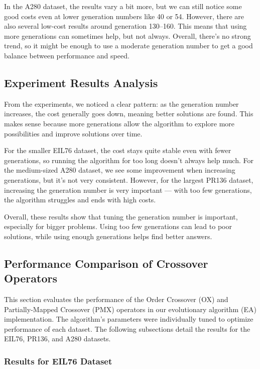 \documentclass{scrartcl}
\begin{document}
In the A280 dataset, the results vary a bit more, but we can still notice some good costs even at lower generation numbers like 40 or 54. However, there are also several low-cost results around generation 130–160. This means that using more generations can sometimes help, but not always. Overall, there's no strong trend, so it might be enough to use a moderate generation number to get a good balance between performance and speed.



\subsection{Experiment Results Analysis}

From the experiments, we noticed a clear pattern: as the generation number increases, the cost generally goes down, meaning better solutions are found. This makes sense because more generations allow the algorithm to explore more possibilities and improve solutions over time.

For the smaller EIL76 dataset, the cost stays quite stable even with fewer generations, so running the algorithm for too long doesn’t always help much. For the medium-sized A280 dataset, we see some improvement when increasing generations, but it’s not very consistent. However, for the largest PR136 dataset, increasing the generation number is very important — with too few generations, the algorithm struggles and ends with high costs.

Overall, these results show that tuning the generation number is important, especially for bigger problems. Using too few generations can lead to poor solutions, while using enough generations helps find better answers.


\subsection{Performance Comparison of Crossover Operators}

This section evaluates the performance of the Order Crossover (OX) and Partially-Mapped Crossover (PMX) operators in our evolutionary algorithm (EA) implementation. The algorithm's parameters were individually tuned to optimize performance of each dataset. The following subsections detail the results for the EIL76, PR136, and A280 datasets.

\subsubsection{Results for EIL76 Dataset}
\end{document}
